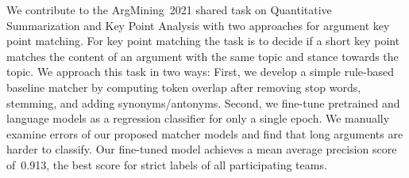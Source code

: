We contribute to the ArgMining~2021 shared task on Quantitative Summarization and Key Point Analysis with two approaches 
for argument key point matching.
For key point matching the task is to decide if a short key point matches the content of an argument with the same topic 
and stance towards the topic.
We approach this task in two ways:
First, we develop a simple rule-based baseline matcher by computing token overlap after removing stop words, stemming, 
and adding synonyms/antonyms.
Second, we fine-tune pretrained \Bert and \Roberta language models as a regression classifier for only a single epoch.
We manually examine errors of our proposed matcher models and find that long arguments are harder to classify. Our fine-tuned \RobertaBase model achieves a mean average precision score of~0.913, the best score for strict labels of all participating teams.
